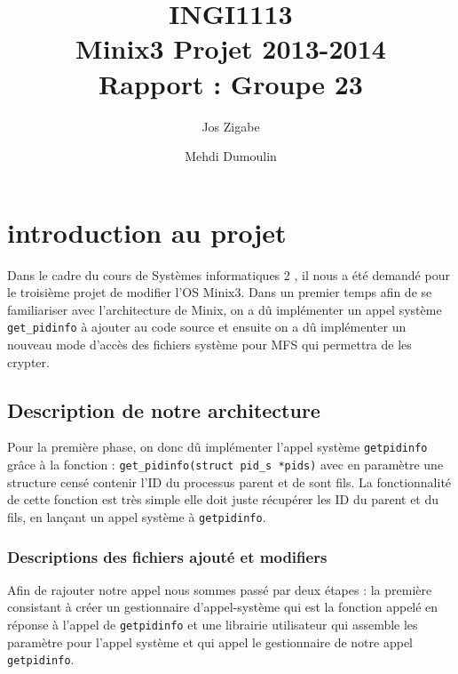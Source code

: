 \documentclass[10pt, onecolumn] {IEEEtran}
\title{INGI1113\\
Minix3 Projet 2013-2014\\
Rapport : Groupe 23}
\author{Jos Zigabe  \and Mehdi Dumoulin}
\begin{document}
\maketitle
\tableofcontents
\newpage

\section{introduction au projet}

Dans le cadre du cours de \og Systèmes informatiques 2 \fg, il nous a été demandé pour le troisième projet de modifier l'OS Minix3. Dans un premier temps afin de se familiariser avec l'architecture de Minix, on a dû implémenter un appel système \texttt{get\_pidinfo} à ajouter au code source et ensuite on a dû implémenter un nouveau mode d'accès des fichiers système pour MFS qui permettra de les crypter.      

\subsection{Description de notre architecture}

Pour la première phase, on donc dû implémenter l'appel système \texttt{getpidinfo} grâce à la fonction : \texttt{get\_pidinfo(struct pid\_s *pids)} avec en paramètre une structure censé contenir l'ID du processus parent et de sont fils. La fonctionnalité de cette fonction est très simple elle doit juste récupérer les ID du parent et du fils, en lançant un appel système à  \texttt{getpidinfo}.\\

\subsubsection{Descriptions des fichiers ajouté et modifiers }

Afin de rajouter notre appel nous sommes passé par deux étapes : la première consistant à créer un gestionnaire d'appel-système qui est la fonction appelé en réponse à l'appel de \texttt{getpidinfo} et une librairie utilisateur qui assemble les paramètre pour l'appel système et qui appel le gestionnaire de notre appel  \texttt{getpidinfo}.\\
\end{document}
